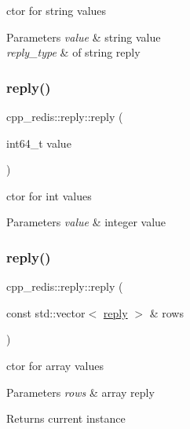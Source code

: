 ctor for string values


\begin{DoxyParams}{Parameters}
{\em value} & string value \\
\hline
{\em reply\+\_\+type} & of string reply \\
\hline
\end{DoxyParams}
\mbox{\label{classcpp__redis_1_1reply_a6200b9fa76196e75fb18aa07e47391f0}} 
\subsubsection{\texorpdfstring{reply()}{reply()}\hspace{0.1cm}{\footnotesize\ttfamily [3/4]}}
{\footnotesize\ttfamily cpp\+\_\+redis\+::reply\+::reply (\begin{DoxyParamCaption}\item[{int64\+\_\+t}]{value }\end{DoxyParamCaption})}

ctor for int values


\begin{DoxyParams}{Parameters}
{\em value} & integer value \\
\hline
\end{DoxyParams}
\mbox{\label{classcpp__redis_1_1reply_af3e08b6b795978757a05a1ac4bb08c68}} 
\subsubsection{\texorpdfstring{reply()}{reply()}\hspace{0.1cm}{\footnotesize\ttfamily [4/4]}}
{\footnotesize\ttfamily cpp\+\_\+redis\+::reply\+::reply (\begin{DoxyParamCaption}\item[{const std\+::vector$<$ \hyperlink{classcpp__redis_1_1reply}{reply} $>$ \&}]{rows }\end{DoxyParamCaption})}

ctor for array values


\begin{DoxyParams}{Parameters}
{\em rows} & array reply \\
\hline
\end{DoxyParams}
\begin{DoxyReturn}{Returns}
current instance 
\end{DoxyReturn}


